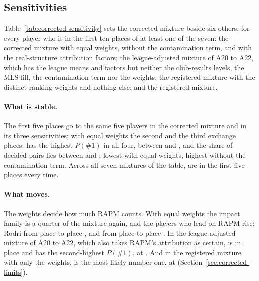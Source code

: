 \documentclass[11pt,a4paper]{article}
\begin{document}
\subsection{Sensitivities}
\label{sec:corrected-sensitivity}

Table~\ref{tab:corrected-sensitivity} sets the corrected mixture beside six
others, for every player who is in the first ten places of at least one of the
seven: the corrected mixture with equal weights, without the contamination
term, and with the real-structure attribution factors; the league-adjusted
mixture of A20 to A22, which has the league means and factors but neither the
club-results levels, the MLS fill, the contamination term nor the weights; the
registered mixture with the distinct-ranking weights and nothing else; and the
registered mixture.

\paragraph{What is stable.}
The first five places go to the same five players in the corrected mixture
and in its three sensitivities; with equal weights the second and the third
exchange places. \CorrectedTopName{} has the highest $P(\#1)$ in all four,
between \CorrectedSensPFirstLo{} and \CorrectedSensPFirstHi{}, and the share
of decided pairs lies between \CorrectedSensDecidedLo{} and
\CorrectedSensDecidedHi{}: lowest with equal weights, highest without the
contamination term. Across all seven mixtures of the table,
\CorrectedAlwaysTopFive{} are in the first five places every time.

\paragraph{What moves.}
The weights decide how much RAPM counts. With equal weights the impact family
is a quarter of the mixture again, and the players who lead on RAPM rise:
Rodri from place \CorrectedRodriPlace{} to place \CorrectedEqualRodriPlace{},
and \TopPlayerName{} from place \CorrectedRegLeaderPlace{} to place
\CorrectedEqualRegLeaderPlace{}. In the league-adjusted mixture of A20 to A22,
which also takes RAPM's attribution as certain, \TopPlayerName{} is in place
\LeagueRegLeaderPlace{} and has the second-highest $P(\#1)$, at
\LeagueSecondPFirst{}. And in the registered mixture with only the weights,
\PrimaryDistinctTopName{} is the most likely number one, at
\PrimaryDistinctTopPFirst{} (Section~\ref{sec:corrected-limits}).
\end{document}
